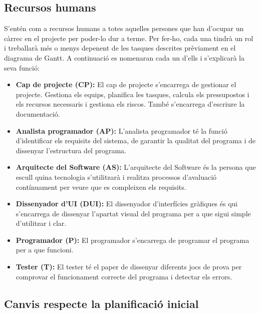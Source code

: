 \documentclass[a4paper]{article}
\begin{document}
\subsection{Recursos humans}
S'entén com a recursos humans a totes aquelles persones que han d'ocupar un càrrec en el projecte per poder-lo dur a terme. Per fer-ho, cada una tindrà un rol i treballarà més o menys depenent de les tasques descrites prèviament en el diagrama de Gantt. A continuació es nomenaran cada un d'ells i s'explicarà la seva funció:
\begin{itemize}
    \item \textbf{Cap de projecte (CP):} El cap de projecte s'encarrega de gestionar el projecte. Gestiona els equips, planifica les tasques, calcula els pressupostos i els recursos necessaris i gestiona els riscos. També s'encarrega d'escriure la documentació.
    
    \item \textbf{Analista programador (AP):} L'analista programador té la funció d'identificar els requisits del sistema, de garantir la qualitat del programa i de dissenyar l'estructura del programa.
    
    \item \textbf{Arquitecte del Software (AS):} L'arquitecte del Software és la persona que escull quina tecnologia s'utilitzarà i realitza processos d'avaluació contínuament per veure que es compleixen els requisits.
    
    \item \textbf{Dissenyador d'UI (DUI):} El dissenyador d'interfícies gràfiques és qui s'encarrega de dissenyar l'apartat visual del programa per a que sigui simple d'utilitzar i clar. 
    
    \item \textbf{Programador (P):} El programador s'encarrega de programar el programa per a que funcioni.
    
    \item \textbf{Tester (T):} El tester té el paper de dissenyar diferents jocs de prova per comprovar el funcionament correcte del programa i detectar els errors.
\end{itemize}

\subsection{Canvis respecte la planificació inicial}
\end{document}
